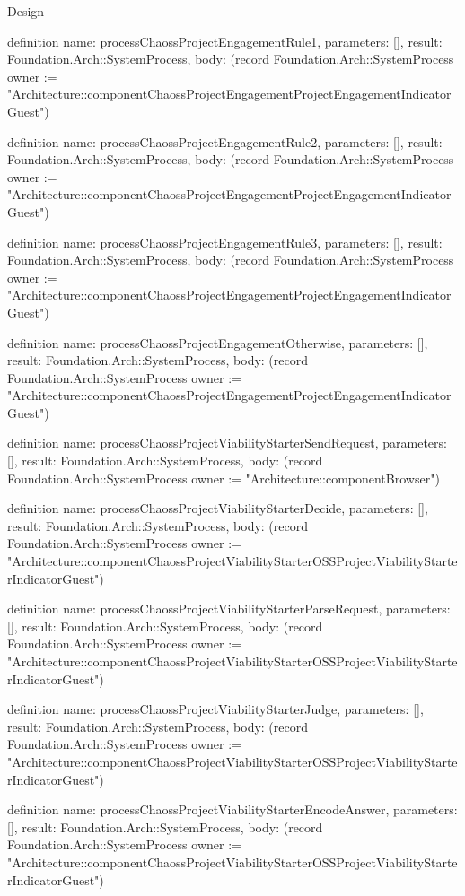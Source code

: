 \begin{lexlean}{Design}
\begin{semanticmodule}
definition{
  name: processChaossProjectEngagementRule1,
  parameters: [],
  result: Foundation.Arch::SystemProcess,
  body: (record Foundation.Arch::SystemProcess {owner := "Architecture::componentChaossProjectEngagementProjectEngagementIndicatorGuest"})
}

definition{
  name: processChaossProjectEngagementRule2,
  parameters: [],
  result: Foundation.Arch::SystemProcess,
  body: (record Foundation.Arch::SystemProcess {owner := "Architecture::componentChaossProjectEngagementProjectEngagementIndicatorGuest"})
}

definition{
  name: processChaossProjectEngagementRule3,
  parameters: [],
  result: Foundation.Arch::SystemProcess,
  body: (record Foundation.Arch::SystemProcess {owner := "Architecture::componentChaossProjectEngagementProjectEngagementIndicatorGuest"})
}

definition{
  name: processChaossProjectEngagementOtherwise,
  parameters: [],
  result: Foundation.Arch::SystemProcess,
  body: (record Foundation.Arch::SystemProcess {owner := "Architecture::componentChaossProjectEngagementProjectEngagementIndicatorGuest"})
}

definition{
  name: processChaossProjectViabilityStarterSendRequest,
  parameters: [],
  result: Foundation.Arch::SystemProcess,
  body: (record Foundation.Arch::SystemProcess {owner := "Architecture::componentBrowser"})
}

definition{
  name: processChaossProjectViabilityStarterDecide,
  parameters: [],
  result: Foundation.Arch::SystemProcess,
  body: (record Foundation.Arch::SystemProcess {owner := "Architecture::componentChaossProjectViabilityStarterOSSProjectViabilityStarterIndicatorGuest"})
}

definition{
  name: processChaossProjectViabilityStarterParseRequest,
  parameters: [],
  result: Foundation.Arch::SystemProcess,
  body: (record Foundation.Arch::SystemProcess {owner := "Architecture::componentChaossProjectViabilityStarterOSSProjectViabilityStarterIndicatorGuest"})
}

definition{
  name: processChaossProjectViabilityStarterJudge,
  parameters: [],
  result: Foundation.Arch::SystemProcess,
  body: (record Foundation.Arch::SystemProcess {owner := "Architecture::componentChaossProjectViabilityStarterOSSProjectViabilityStarterIndicatorGuest"})
}

definition{
  name: processChaossProjectViabilityStarterEncodeAnswer,
  parameters: [],
  result: Foundation.Arch::SystemProcess,
  body: (record Foundation.Arch::SystemProcess {owner := "Architecture::componentChaossProjectViabilityStarterOSSProjectViabilityStarterIndicatorGuest"})
}


\end{semanticmodule}
\end{lexlean}
